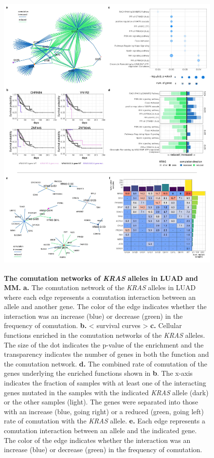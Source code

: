 \documentclass[english, 10pt, letterpaper]{article}
\newcommand{\KRAS}{\emph{KRAS}}
\begin{document}
\begin{figure}
\centering
\includegraphics[height=150mm]{figures/Figure_03.jpeg}
\caption{
    \textbf{The comutation networks of \KRAS{} alleles in LUAD and MM.}
    \textbf{a.} The comutation network of the \KRAS{} alleles in LUAD where each edge represents a comutation interaction between an allele and another gene. The color of the edge indicates whether the interaction was an increase (blue) or decrease (green) in the frequency of comutation.
    \textbf{b.} < survival curves >
    \textbf{c.} Cellular functions enriched in the comutation networks of the \KRAS{} alleles. The size of the dot indicates the p-value of the enrichment and the transparency indicates the number of genes in both the function and the comutation network.
    \textbf{d.} The combined rate of comutation of the genes underlying the enriched functions shown in \textbf{b}. The x-axis indicates the fraction of samples with at least one of the interacting genes mutated in the samples with the indicated \KRAS{} allele (dark) or the other samples (light). The genes were separated into those with an increase (blue, going right) or a reduced (green, going left) rate of comutation with the \KRAS{} allele.
    \textbf{e.} Each edge represents a comutation interaction between an allele and the indicated gene. The color of the edge indicates whether the interaction was an increase (blue) or decrease (green) in the frequency of comutation.
}
\end{figure}
\end{document}
